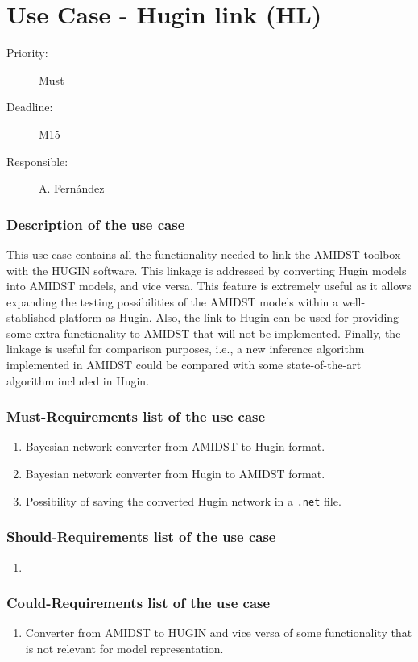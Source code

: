 \newpage
\section{Use Case - Hugin link (HL)}
\label{UseCase:HL}

\begin{description}
\item[Priority:] Must
\item[Deadline:] M15
\item[Responsible:] A. Fern\'andez
\end{description}

\subsubsection*{Description of the use case}

This use case contains all the functionality needed to link the AMIDST toolbox with the HUGIN software. This linkage is addressed by converting Hugin models into AMIDST models, and vice versa. This feature is extremely useful as it allows expanding the testing possibilities of the AMIDST models within a well-stablished platform as Hugin. Also, the link to Hugin can be used for providing some extra functionality to AMIDST that will not be implemented. Finally, the linkage is useful for comparison purposes, i.e., a new inference algorithm implemented in AMIDST could be compared with some state-of-the-art algorithm included in Hugin.

\subsubsection*{Must-Requirements list of the use case}

\begin{enumerate}
\item Bayesian network converter from AMIDST to Hugin format. 
\item Bayesian network converter from Hugin to AMIDST format.
\item Possibility of saving the converted Hugin network in a \texttt{.net} file.
\end{enumerate}

\subsubsection*{Should-Requirements list of the use case}

\begin{enumerate}
\item 
\end{enumerate}

\subsubsection*{Could-Requirements list of the use case}

\begin{enumerate}
\item Converter from AMIDST to HUGIN  and vice versa of some functionality that is not relevant for model representation.
\end{enumerate}

